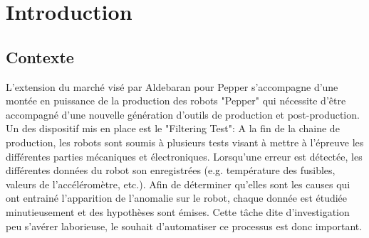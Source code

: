 \chapter{Introduction}
\label{Introduction}
\thispagestyle{fancy}

\section{Contexte}
\label{Introduction:Contexte}

L'extension du marché visé par Aldebaran pour Pepper s'accompagne d'une montée en puissance de la production des robots "Pepper" qui nécessite d'être accompagné d'une nouvelle génération d'outils de production et post-production. Un des dispositif mis en place est le "Filtering Test": A la fin de la chaine de production, les robots sont soumis à plusieurs tests visant à mettre à l'épreuve les différentes parties mécaniques et électroniques. Lorsqu'une erreur est détectée,  les différentes données du robot son enregistrées (e.g. température des fusibles, valeurs de l'accéléromètre, etc.). Afin de déterminer qu'elles sont les causes qui ont entrainé l'apparition de l'anomalie sur le robot, chaque donnée est étudiée minutieusement et des hypothèses sont émises. Cette tâche dite d'investigation peu s'avérer laborieuse, le souhait d'automatiser ce processus est donc important.